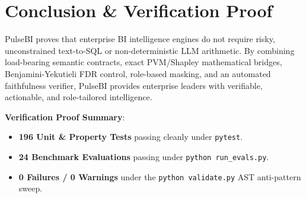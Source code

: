 \documentclass[11pt,a4paper]{article}
\begin{document}
\section{Conclusion \& Verification Proof}
PulseBI proves that enterprise BI intelligence engines do not require risky, unconstrained text-to-SQL or non-deterministic LLM arithmetic. By combining load-bearing semantic contracts, exact PVM/Shapley mathematical bridges, Benjamini-Yekutieli FDR control, role-based masking, and an automated faithfulness verifier, PulseBI provides enterprise leaders with verifiable, actionable, and role-tailored intelligence.

\textbf{Verification Proof Summary}:
\begin{itemize}
    \item \textbf{196 Unit \& Property Tests} passing cleanly under \texttt{pytest}.
    \item \textbf{24 Benchmark Evaluations} passing under \texttt{python run\_evals.py}.
    \item \textbf{0 Failures / 0 Warnings} under the \texttt{python validate.py} AST anti-pattern sweep.
\end{itemize}
\end{document}
